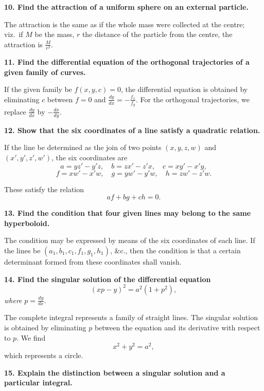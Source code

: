 \documentclass[11pt,a4paper]{book}
\begin{document}
\smallskip

\noindent\textbf{10. Find the attraction of a uniform sphere on an external particle.}

The attraction is the same as if the whole mass were collected at the centre; viz.\ if $M$ be the mass, $r$ the distance of the particle from the centre, the attraction is $\frac{M}{r^2}$.

\smallskip

\noindent\textbf{11. Find the differential equation of the orthogonal trajectories of a given family of curves.}

If the given family be $f(x, y, c) = 0$, the differential equation is obtained by eliminating $c$ between $f = 0$ and $\frac{dy}{dx} = -\frac{f_x}{f_y}$. For the orthogonal trajectories, we replace $\frac{dy}{dx}$ by $-\frac{dx}{dy}$.

\smallskip

\noindent\textbf{12. Show that the six coordinates of a line satisfy a quadratic relation.}

If the line be determined as the join of two points $(x, y, z, w)$ and $(x', y', z', w')$, the six coordinates are
\[
a = yz' - y'z,\quad b = zx' - z'x,\quad c = xy' - x'y,
\]
\[
f = xw' - x'w,\quad g = yw' - y'w,\quad h = zw' - z'w.
\]

These satisfy the relation
\[
af + bg + ch = 0.
\]

\smallskip

\noindent\textbf{13. Find the condition that four given lines may belong to the same hyperboloid.}

The condition may be expressed by means of the six coordinates of each line. If the lines be $(a_1, b_1, c_1, f_1, g_1, h_1)$, \&c., then the condition is that a certain determinant formed from these coordinates shall vanish.

\smallskip

\noindent\textbf{14. Find the singular solution of the differential equation}
\[
(xp - y)^2 = a^2 (1 + p^2),
\]
\textit{where} $p = \frac{dy}{dx}$.

The complete integral represents a family of straight lines. The singular solution is obtained by eliminating $p$ between the equation and its derivative with respect to $p$. We find
\[
x^2 + y^2 = a^2,
\]
which represents a circle.

\smallskip

\noindent\textbf{15. Explain the distinction between a singular solution and a particular integral.}
\end{document}
